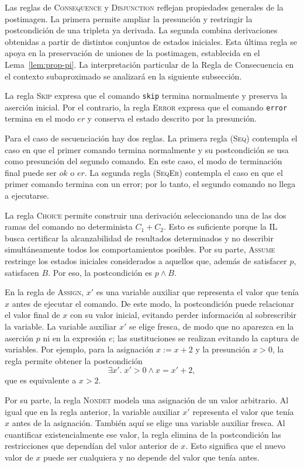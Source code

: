 \documentclass[a4paper,	11pt]{report}
\begin{document}
Las reglas de \textsc{Consequence} y \textsc{Disjunction} reflejan propiedades generales de la postimagen.
La primera permite ampliar la presunción y restringir la postcondición de una tripleta ya derivada.
La segunda combina derivaciones obtenidas a partir de distintos conjuntos de estados iniciales.
Esta última regla se apoya en la preservación de uniones de la postimagen,
establecida en el Lema~\ref{lem:prop-pi}.
La interpretación particular de la Regla de Consecuencia en el contexto subaproximado se analizará en la siguiente subsección.

La regla \textsc{Skip} expresa que el comando \texttt{skip} termina normalmente y preserva la aserción inicial.
Por el contrario, la regla \textsc{Error} expresa que el comando \texttt{error} termina en el modo $er$
y conserva el estado descrito por la presunción.

Para el caso de secuenciación hay dos reglas.
La primera regla (\textsc{Seq}) contempla el caso en que el
primer comando termina normalmente y su postcondición se usa como presunción
del segundo comando.
En este caso, el modo de terminación final puede ser $ok$ o $er$.
%
La segunda regla (\textsc{SeqEr}) contempla el caso en que el
primer comando termina con un error; por lo tanto, el segundo comando no llega a
ejecutarse.

La regla \textsc{Choice} permite construir una derivación seleccionando una de las dos ramas del comando no determinista $C_1 + C_2$.
Esto es suficiente porque la IL busca certificar la alcanzabilidad de resultados determinados
y no describir simultáneamente todos los comportamientos posibles.
Por su parte, \textsc{Assume} restringe los estados iniciales considerados a aquellos que,
además de satisfacer $p$, satisfacen $B$.
Por eso, la postcondición es $p \land B$.

En la regla de \textsc{Assign},
$x'$ es una variable auxiliar que representa el valor que tenía $x$ antes de ejecutar el comando.
De este modo, la postcondición puede relacionar el valor final de $x$ con su valor inicial,
evitando perder información al sobrescribir la variable.
La variable auxiliar $x'$ se elige fresca,
de modo que no aparezca en la aserción $p$ ni en la expresión $e$;
las sustituciones se realizan evitando la captura de variables.
Por ejemplo, para la asignación $x := x + 2$ y la presunción $x > 0$,
la regla permite obtener la postcondición
$$\exists x'. \; x' > 0 \land x = x' + 2,$$
que es equivalente a $x > 2$.

Por su parte, la regla \textsc{Nondet} modela una asignación de un valor arbitrario.
Al igual que en la regla anterior,
la variable auxiliar $x'$ representa el valor que tenía $x$ antes de la asignación.
También aquí se elige una variable auxiliar fresca.
Al cuantificar existencialmente ese valor,
la regla elimina de la postcondición las restricciones que dependían del valor anterior de $x$.
Esto significa que el nuevo valor de $x$ puede ser cualquiera y no depende del valor que tenía antes.
\end{document}
